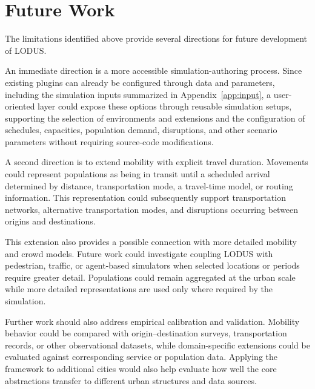 \section{Future Work}
\label{sec:future_work}

The limitations identified above provide several directions for future development of LODUS.

An immediate direction is a more accessible simulation-authoring process. Since existing plugins can already be configured through data and parameters, including the simulation inputs summarized in Appendix~\ref{app:input}, a user-oriented layer could expose these options through reusable simulation setups, supporting the selection of environments and extensions and the configuration of schedules, capacities, population demand, disruptions, and other scenario parameters without requiring source-code modifications.

A second direction is to extend mobility with explicit travel duration. Movements could represent populations as being in transit until a scheduled arrival determined by distance, transportation mode, a travel-time model, or routing information. This representation could subsequently support transportation networks, alternative transportation modes, and disruptions occurring between origins and destinations.

This extension also provides a possible connection with more detailed mobility and crowd models. Future work could investigate coupling LODUS with pedestrian, traffic, or agent-based simulators when selected locations or periods require greater detail. Populations could remain aggregated at the urban scale while more detailed representations are used only where required by the simulation.


Further work should also address empirical calibration and validation. Mobility behavior could be compared with origin--destination surveys, transportation records, or other observational datasets, while domain-specific extensions could be evaluated against corresponding service or population data. Applying the framework to additional cities would also help evaluate how well the core abstractions transfer to different urban structures and data sources.

